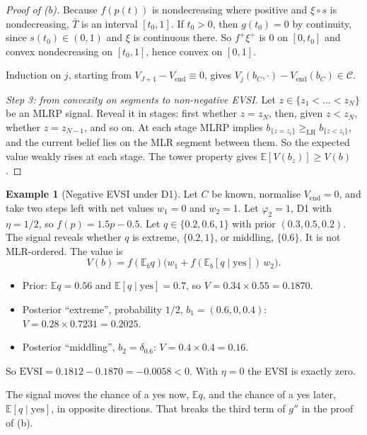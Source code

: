 \documentclass[11pt,a4paper]{article}
\theoremstyle{definition}
\newtheorem{example}[theorem]{Example}
\theoremstyle{remark}
\newcommand{\E}{\mathbb{E}}
\newcommand{\Vend}{V_{\mathrm{end}}}
\begin{document}
\begin{proof}[Proof of (b)]
Because $f(p(t))$ is nondecreasing where positive and $\xi\circ s$ is nondecreasing, $\bar T$ is an interval $[t_0,1]$. If $t_0>0$, then $g(t_0)=0$ by continuity, since $s(t_0)\in(0,1)$ and $\xi$ is continuous there. So $f^+\xi^+$ is $0$ on $[0,t_0]$ and convex nondecreasing on $[t_0,1]$, hence convex on $[0,1]$.

Induction on $j$, starting from $V_{J+1}-\Vend\equiv0$, gives $V_j(b_C,\cdot)-\Vend(b_C)\in\mathcal C$.

\emph{Step 3: from convexity on segments to non-negative EVSI.} Let $z\in\{z_1<\dots<z_N\}$ be an MLRP signal. Reveal it in stages: first whether $z=z_N$, then, given $z<z_N$, whether $z=z_{N-1}$, and so on. At each stage MLRP implies $b_{\{z=z_i\}}\ge_{\mathrm{LR}}b_{\{z<z_i\}}$, and the current belief lies on the MLR segment between them. So the expected value weakly rises at each stage. The tower property gives $\E[V(b_z)]\ge V(b)$.
\end{proof}

\begin{example}[Negative EVSI under D1]\label{ex:neg}
Let $C$ be known, normalise $\Vend=0$, and take two steps left with net values $w_1=0$ and $w_2=1$. Let $\varphi_2=1$, D1 with $\eta=1/2$, so $f(p)=1.5p-0.5$. Let $q\in\{0.2,0.6,1\}$ with prior $(0.3,0.5,0.2)$. The signal reveals whether $q$ is extreme, $\{0.2,1\}$, or middling, $\{0.6\}$. It is not MLR-ordered. The value is
\[
V(b)=f(\E_bq)\bigl(w_1+f(\E_b[q\mid\mathrm{yes}])\,w_2\bigr).
\]
\begin{itemize}[nosep]
\item Prior: $\E q=0.56$ and $\E[q\mid\mathrm{yes}]=0.7$, so $V=0.34\times0.55=0.1870$.
\item Posterior ``extreme'', probability $1/2$, $b_1=(0.6,0,0.4)$: $V=0.28\times0.7231=0.2025$.
\item Posterior ``middling'', $b_2=\delta_{0.6}$: $V=0.4\times0.4=0.16$.
\end{itemize}
So $\mathrm{EVSI}=0.1812-0.1870=-0.0058<0$. With $\eta=0$ the EVSI is exactly zero.

The signal moves the chance of a yes now, $\E q$, and the chance of a yes later, $\E[q\mid\mathrm{yes}]$, in opposite directions. That breaks the third term of $g''$ in the proof of (b).
\end{example}
\end{document}

